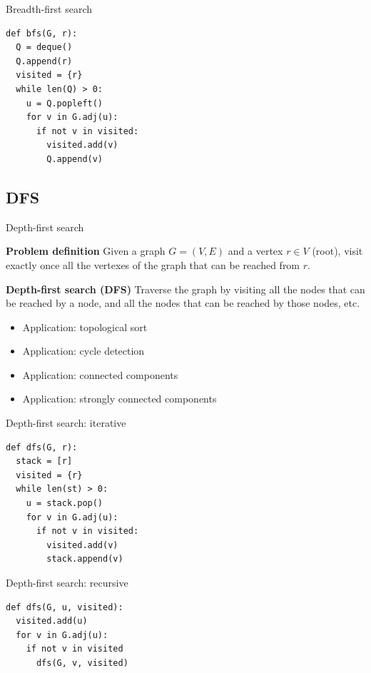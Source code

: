 \documentclass[compress]{beamer}
\begin{document}
\begin{frame}[fragile]{Breadth-first search}
\begin{lstlisting}
def bfs(G, r):
  Q = deque()
  Q.append(r)
  visited = {r}
  while len(Q) > 0:
    u = Q.popleft()
    for v in G.adj(u):
      if not v in visited:
        visited.add(v)
        Q.append(v)
\end{lstlisting}
\end{frame}

\subsection{DFS}
\begin{frame}{Depth-first search}
  \begin{block}{\textbf{Problem definition}}
    Given a graph $G = (V, E)$ and a vertex $r \in V$ (root), visit exactly once all the vertexes of the graph that can be reached from $r$.
  \end{block}
  \begin{block}{\textbf{Depth-first search (DFS)}}
    Traverse the graph by visiting all the nodes that can be reached by a node, and all the nodes that can be reached by those nodes, etc.
    \begin{itemize}
    \item Application: topological sort
    \item Application: cycle detection
    \item Application: connected components
    \item Application: strongly connected components
    \end{itemize}
  \end{block}
\end{frame}

\begin{frame}[fragile]{Depth-first search: iterative}
\begin{lstlisting}
def dfs(G, r):
  stack = [r]
  visited = {r}
  while len(st) > 0:
    u = stack.pop()
    for v in G.adj(u):
      if not v in visited:
        visited.add(v)
        stack.append(v)
\end{lstlisting}
\end{frame}

\begin{frame}[fragile]{Depth-first search: recursive}
\begin{lstlisting}
def dfs(G, u, visited):
  visited.add(u)
  for v in G.adj(u):
    if not v in visited
      dfs(G, v, visited)
\end{lstlisting}
\end{frame}
\end{document}
